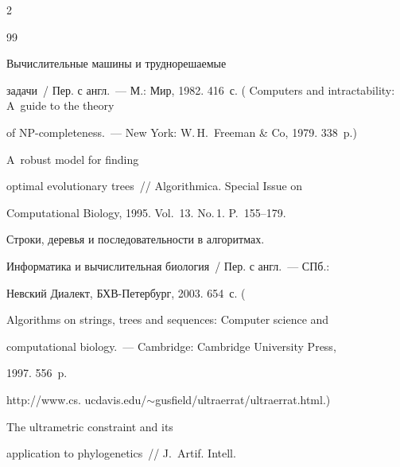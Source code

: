 \begin{multicols}{2}
{\small\frenchspacing


{%




\begin{thebibliography}{99}










 Вычислительные машины и труднорешаемые


задачи~/ Пер. с англ.~--- М.: Мир, 1982. 416~с. ( Computers and intractability: A~guide to the theory


of NP-completeness.~--- New York: W.\,H.~Freeman \& Co, 1979. 338~p.)










 A~robust model for finding


optimal evolutionary trees~// Algorithmica. Special Issue on


Computational Biology, 1995. Vol.~13. No.\,1. P.~155--179.







 Строки, деревья и последовательности в алгоритмах.


Информатика и вычислительная биология~/ Пер. с англ.~--- СПб.:


Невский Диалект, БХВ-Петербург, 2003. 654~с. (


Algorithms on strings, trees and sequences: Computer \mbox{science} and


computational biology.~--- Cambridge: Cambridge University Press,


1997. 556~p.


{\sf http://www.cs. ucdavis.edu/$\sim$gusfield/ultraerrat/ultraerrat.html}.)







 The ultrametric constraint and its


application to phylogenetics~// J.~Artif. Intell.



\end{thebibliography}}}
\end{multicols}

